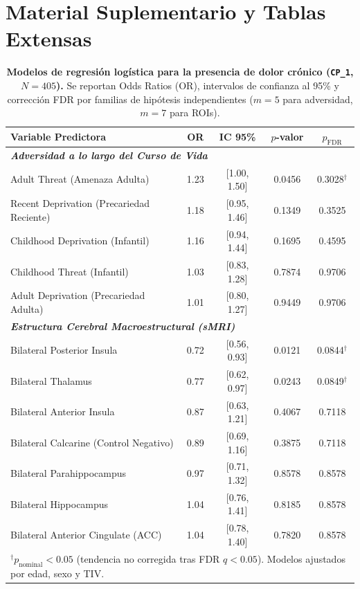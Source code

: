 \documentclass[11pt,a4paper]{article}
\begin{document}
\clearpage
\appendix
\section*{Material Suplementario y Tablas Extensas}

\renewcommand{\thetable}{S\arabic{table}}
\renewcommand{\thefigure}{S\arabic{figure}}
\setcounter{table}{0}
\setcounter{figure}{0}

\begin{table}[htbp]
\centering
\small
\caption{\textbf{Modelos de regresión logística para la presencia de dolor crónico (\texttt{CP\_1}, $N = 405$).} Se reportan Odds Ratios (OR), intervalos de confianza al 95\% y corrección FDR por familias de hipótesis independientes 
($m=5$ para adversidad, $m=7$ para ROIs).}
\label{tab:logistic_results}
\begin{tabular}{lcccc}
\toprule
\textbf{Variable Predictora} & \textbf{OR} & \textbf{IC 95\%} & \textbf{$p$-valor} & \textbf{$p_{\text{FDR}}$} \\
\midrule
\multicolumn{5}{l}{\textit{\textbf{Adversidad a lo largo del Curso de Vida}}} \\
\quad Adult Threat (Amenaza Adulta)          & 1.23 & [1.00, 1.50] & 0.0456 & 0.3028$^\dagger$ \\
\quad Recent Deprivation (Precariedad Reciente) & 1.18 & [0.95, 1.46] & 0.1349 & 0.3525 \\
\quad Childhood Deprivation (Infantil)        & 1.16 & [0.94, 1.44] & 0.1695 & 0.4595 \\
\quad Childhood Threat (Infantil)             & 1.03 & [0.83, 1.28] & 0.7874 & 0.9706 \\
\quad Adult Deprivation (Precariedad Adulta)   & 1.01 & [0.80, 1.27] & 0.9449 & 0.9706 \\
\midrule
\multicolumn{5}{l}{\textit{\textbf{Estructura Cerebral Macroestructural (sMRI)}}} \\
\quad Bilateral Posterior Insula              & 0.72 & [0.56, 0.93] & 0.0121 & 0.0844$^\dagger$ \\
\quad Bilateral Thalamus                      & 0.77 & [0.62, 0.97] & 0.0243 & 0.0849$^\dagger$ \\
\quad Bilateral Anterior Insula               & 0.87 & [0.63, 1.21] & 0.4067 & 0.7118 \\
\quad Bilateral Calcarine (Control Negativo)  & 0.89 & [0.69, 1.16] & 0.3875 & 0.7118 \\
\quad Bilateral Parahippocampus               & 0.97 & [0.71, 1.32] & 0.8578 & 0.8578 \\
\quad Bilateral Hippocampus                   & 1.04 & [0.76, 1.41] & 0.8185 & 0.8578 \\
\quad Bilateral Anterior Cingulate (ACC)      & 1.04 & [0.78, 1.40] & 0.7820 & 0.8578 \\
\bottomrule
\multicolumn{5}{l}{\footnotesize $^\dagger p_{\text{nominal}} < 0.05$ (tendencia no corregida tras FDR $q < 0.05$). Modelos ajustados por edad, sexo y TIV.}
\end{tabular}
\end{table}
\end{document}
